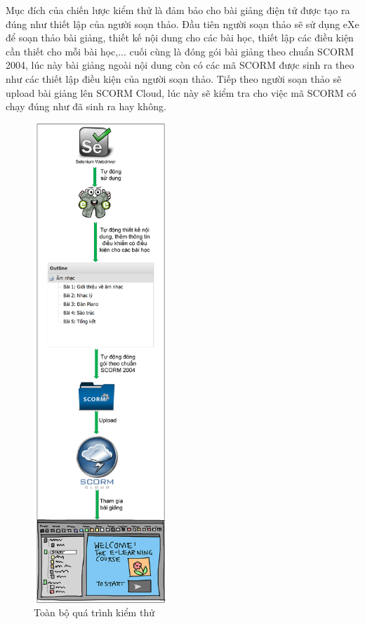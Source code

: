 Mục đích của chiến lược kiểm thử là đảm bảo cho bài giảng điện tử được tạo ra đúng như thiết lập của người soạn thảo. Đầu tiên người soạn thảo sẽ sử dụng eXe để soạn thảo bài giảng, thiết kế nội dung cho các bài học, thiết lập các điều kiện cần thiết cho mỗi bài học,... cuối cùng là đóng gói bài giảng theo chuẩn SCORM 2004, lúc này bài giảng ngoài nội dung còn có các mã SCORM được sinh ra theo như các thiết lập điều kiện của người soạn thảo. Tiếp theo người soạn thảo sẽ upload bài giảng lên SCORM Cloud, lúc này sẽ kiểm tra cho việc mã SCORM có chạy đúng như đã sinh ra hay không.

\newpage

\begin{center}
	\begin{figure}[htp]
		\begin{center}
			\includegraphics[width=5cm]{Chapter5/Pictures/picture51.png}
		\end{center}
		\caption{Toàn bộ quá trình kiểm thử}
		\label{refhinhchuong71}
	\end{figure}
\end{center}

